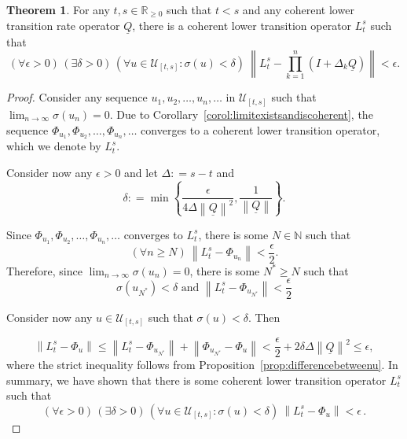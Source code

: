 \documentclass[10pt]{paper}
\theoremstyle{definition}
\newtheorem{theorem}{Theorem}
\newcommand{\nats}{\mathbb{N}}
\newcommand{\reals}{\mathbb{R}}
\newcommand{\realsnonneg}{\reals_{\geq 0}}
\newcommand{\lbound}{L}
\newcommand{\lrate}{\underline{Q}}
\newcommand{\norm}[1]{\left\lVert #1 \right\rVert}
\newcommand{\coloneqq}{:\!=}
\begin{document}
\begin{theorem}\label{theo:convergencelowerbound}
For any $t,s\in\realsnonneg$ such that $t<s$ and any coherent lower transition rate operator $\lrate$, there is a coherent lower transition operator $\lbound_t^s$ such that 
\begin{equation*}
(\forall\epsilon>0)\,
(\exists\delta>0)\,
(\forall u\in\mathcal{U}_{[t,s]}\colon\sigma(u)<\delta)~\norm{\lbound_t^s - \prod_{k=1}^n(I+\Delta_k\lrate)}<\epsilon.
\end{equation*}
\end{theorem}
\begin{proof}
Consider any sequence $u_1,u_2,\dots,u_n,\dots$ in $\mathcal{U}_{[t,s]}$ such that $\lim_{n\to\infty}\sigma(u_n)=0$. Due to Corollary~\ref{corol:limitexistsandiscoherent}, the sequence $\Phi_{u_1},\Phi_{u_2},\dots,\Phi_{u_n},\dots$ converges to a coherent lower transition operator, which we denote by $\lbound_t^s$. 

Consider now any $\epsilon>0$ and let $\Delta\coloneqq s-t$ and
\begin{equation*}
\delta\coloneqq\min\left\{\frac{\epsilon}{4\Delta\norm{\lrate}^2},\frac{1}{\norm{\lrate}}\right\}.
\end{equation*}

\noindent Since $\Phi_{u_1},\Phi_{u_2},\dots,\Phi_{u_n},\dots$ converges to $\lbound_t^s$, there is some $N\in\nats$ such that
\begin{equation*}
(\forall n\geq N)~\norm{\lbound_t^s - \Phi_{u_n}}<\frac{\epsilon}{2}.
\end{equation*}
Therefore, since $\lim_{n\to\infty}\sigma(u_n)=0$, there is some $N^*\geq N$ such that
\begin{equation*}
\sigma(u_{N^*})<\delta\text{ and }\norm{\lbound_t^s - \Phi_{u_{N^*}}}<\frac{\epsilon}{2}
\end{equation*}

\noindent Consider now any $u\in\mathcal{U}_{[t,s]}$ such that $\sigma(u)<\delta$. Then

\begin{equation*}
\norm{\lbound_t^s - \Phi_u}\leq\norm{\lbound_t^s-\Phi_{u_{N^*}}}
+\norm{\Phi_{u_{N^*}}-\Phi_u}
<\frac{\epsilon}{2}+2\delta\Delta\norm{\lrate}^2\leq\epsilon,
\end{equation*}
where the strict inequality follows from Proposition~\ref{prop:differencebetweenu}.
In summary, we have shown that there is some coherent lower transition operator $\lbound_t^s$ such that
\begin{equation*}
(\forall\epsilon>0)\,
(\exists\delta>0)\,
(\forall u\in\mathcal{U}_{[t,s]}\colon\sigma(u)<\delta)~\norm{\lbound_t^s - \Phi_u}<\epsilon\,.
\end{equation*}
\end{proof}
\end{document}
